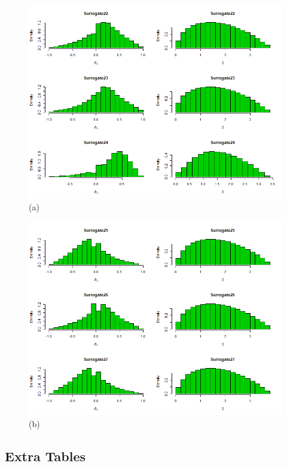 \documentclass[a4paper,12pt]{article}
\begin{document}
	\begin{figure}[H]
		\centering
		\begin{minipage}{0.45\textwidth}
			\includegraphics[scale=0.35]{icaplots8.png}\\(a)
		\end{minipage} 
		\begin{minipage}{0.45\textwidth}
			\includegraphics[scale=0.35]{icaplots9.png}\\(b)
		\end{minipage} 
	\end{figure}
	
	\subsection*{Extra Tables}
	
\end{document}
